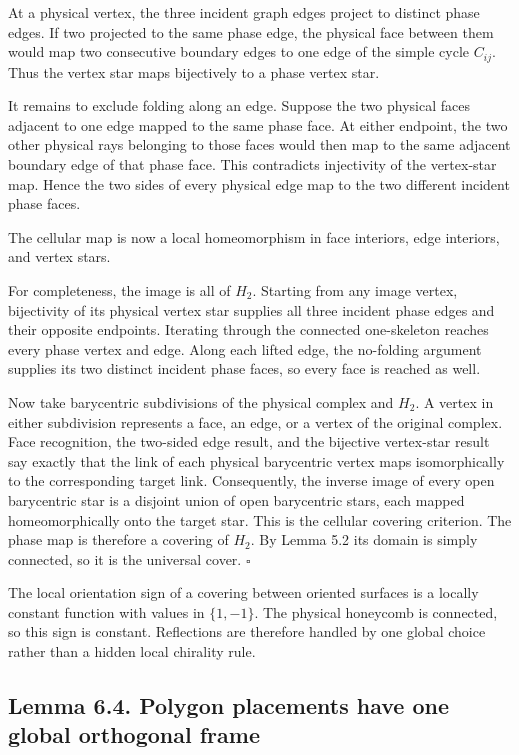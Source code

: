 \documentclass[11pt]{article}
\begin{document}
At a physical vertex, the three incident graph edges project to distinct
phase edges. If two projected to the same phase edge, the physical face
between them would map two consecutive boundary edges to one edge of the
simple cycle \(C_{ij}\). Thus the vertex star maps bijectively to a phase
vertex star.

It remains to exclude folding along an edge. Suppose the two physical faces
adjacent to one edge mapped to the same phase face. At either endpoint, the
two other physical rays belonging to those faces would then map to the same
adjacent boundary edge of that phase face. This contradicts injectivity of
the vertex-star map. Hence the two sides of every physical edge map to the
two different incident phase faces.

The cellular map is now a local homeomorphism in face interiors, edge
interiors, and vertex stars.

For completeness, the image is all of \(H_2\). Starting from any image
vertex, bijectivity of its physical vertex star supplies all three incident
phase edges and their opposite endpoints. Iterating through the connected
one-skeleton reaches every phase vertex and edge. Along each lifted edge,
the no-folding argument supplies its two distinct incident phase faces, so
every face is reached as well.

Now take barycentric subdivisions of the physical complex and \(H_2\). A
vertex in either subdivision represents a face, an edge, or a vertex of the
original complex. Face recognition, the two-sided edge result, and the
bijective vertex-star result say exactly that the link of each physical
barycentric vertex maps isomorphically to the corresponding target link.
Consequently, the inverse image of every open barycentric star is a disjoint
union of open barycentric stars, each mapped homeomorphically onto the
target star. This is the cellular covering criterion. The phase map is
therefore a covering of \(H_2\). By Lemma 5.2 its domain is simply connected,
so it is the universal cover. \(\square\)

The local orientation sign of a covering between oriented surfaces is a
locally constant function with values in \(\{1,-1\}\). The physical
honeycomb is connected, so this sign is constant. Reflections are therefore
handled by one global choice rather than a hidden local chirality rule.

\subsection*{Lemma 6.4. Polygon placements have one global orthogonal frame}
\end{document}
